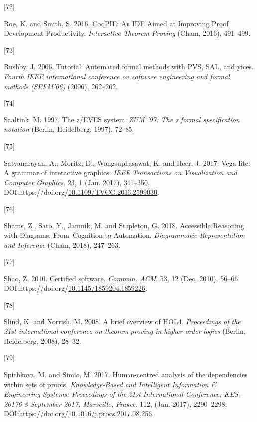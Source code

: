\documentclass[
]{article}
\newlength{\cslhangindent}
\newlength{\csllabelwidth}
\newlength{\cslentryspacingunit} %
\newenvironment{CSLReferences}[2] %
 {%
  \setlength{\parindent}{0pt}
  \ifodd #1
  \let\oldpar\par
  \def\par{\hangindent=\cslhangindent\oldpar}
  \fi
  \setlength{\parskip}{#2\cslentryspacingunit}
 }%
 {}
\newcommand{\CSLLeftMargin}[1]{\parbox[t]{\csllabelwidth}{#1}}
\newcommand{\CSLRightInline}[1]{\parbox[t]{\linewidth - \csllabelwidth}{#1}\break}
\begin{document}
\begin{CSLReferences}{0}{0}
\leavevmode{}%
\CSLLeftMargin{{[}72{]} }
\CSLRightInline{Roe, K. and Smith, S. 2016. {CoqPIE}: {An} {IDE} {Aimed}
at {Improving} {Proof} {Development} {Productivity}. \emph{Interactive
{Theorem} {Proving}} (Cham, 2016), 491--499.}

\leavevmode{}%
\CSLLeftMargin{{[}73{]} }
\CSLRightInline{Rushby, J. 2006. Tutorial: Automated formal methods with
PVS, SAL, and yices. \emph{Fourth IEEE international conference on
software engineering and formal methods (SEFM'06)} (2006), 262--262.}

\leavevmode{}%
\CSLLeftMargin{{[}74{]} }
\CSLRightInline{Saaltink, M. 1997. The z/EVES system. \emph{ZUM '97: The
z formal specification notation} (Berlin, Heidelberg, 1997), 72--85.}

\leavevmode{}%
\CSLLeftMargin{{[}75{]} }
\CSLRightInline{Satyanarayan, A., Moritz, D., Wongsuphasawat, K. and
Heer, J. 2017. Vega-lite: A grammar of interactive graphics. \emph{IEEE
Transactions on Visualization and Computer Graphics}. 23, 1 (Jan. 2017),
341--350.
DOI:https://doi.org/\href{https://doi.org/10.1109/TVCG.2016.2599030}{10.1109/TVCG.2016.2599030}.}

\leavevmode{}%
\CSLLeftMargin{{[}76{]} }
\CSLRightInline{Shams, Z., Sato, Y., Jamnik, M. and Stapleton, G. 2018.
Accessible {Reasoning} with {Diagrams}: {From}~{Cognition} to
{Automation}. \emph{Diagrammatic {Representation} and {Inference}}
(Cham, 2018), 247--263.}

\leavevmode{}%
\CSLLeftMargin{{[}77{]} }
\CSLRightInline{Shao, Z. 2010. Certified software. \emph{Commun. ACM}.
53, 12 (Dec. 2010), 56--66.
DOI:https://doi.org/\href{https://doi.org/10.1145/1859204.1859226}{10.1145/1859204.1859226}.}

\leavevmode{}%
\CSLLeftMargin{{[}78{]} }
\CSLRightInline{Slind, K. and Norrish, M. 2008. A brief overview of
HOL4. \emph{Proceedings of the 21st international conference on theorem
proving in higher order logics} (Berlin, Heidelberg, 2008), 28--32.}

\leavevmode{}%
\CSLLeftMargin{{[}79{]} }
\CSLRightInline{Spichkova, M. and Simic, M. 2017. Human-centred analysis
of the dependencies within sets of proofs. \emph{Knowledge-Based and
Intelligent Information \& Engineering Systems: Proceedings of the 21st
International Conference, KES-20176-8 September 2017, Marseille,
France}. 112, (Jan. 2017), 2290--2298.
DOI:https://doi.org/\href{https://doi.org/10.1016/j.procs.2017.08.256}{10.1016/j.procs.2017.08.256}.}


\end{CSLReferences}
\end{document}
